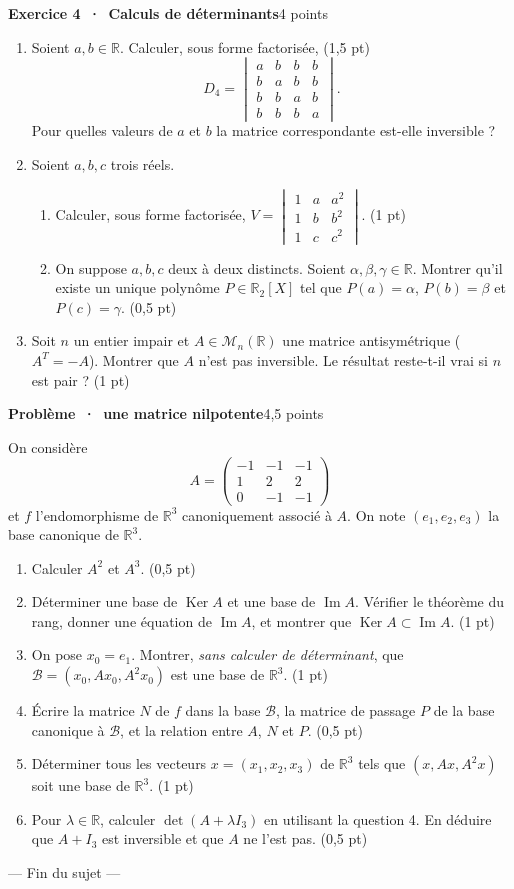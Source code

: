 \documentclass[a4paper,11pt]{article}
\numberwithin{equation}{section}
\numberwithin{figure}{section}
\numberwithin{table}{section}
\theoremstyle{enonce}
\theoremstyle{exemple}
\theoremstyle{remarque}
\newcommand{\R}{\mathbb{R}}
\providecommand{\Ker}{\operatorname{Ker}}\renewcommand{\Im}{\operatorname{Im}}
\newcommand{\pts}[1]{\hfill{\footnotesize\sffamily\color{Gris}(#1)}}
\newcommand{\Ex}[3]{\par\needspace{6\baselineskip}\vspace{1.3em}\noindent
  {\sffamily\bfseries\large\color{Bleu}Exercice #1 \,·\, #2}\hfill{\sffamily\small\color{Ocre}#3}\par
  \vspace{2pt}{\color{Filet}\rule{\linewidth}{0.4pt}}\par\smallskip}
\newcommand{\Pb}[2]{\par\needspace{6\baselineskip}\vspace{1.3em}\noindent
  {\sffamily\bfseries\large\color{Bleu}Problème \,·\, #1}\hfill{\sffamily\small\color{Ocre}#2}\par
  \vspace{2pt}{\color{Filet}\rule{\linewidth}{0.4pt}}\par\smallskip}
\begin{document}
\Ex{4}{Calculs de déterminants}{4 points}
\begin{enumerate}
\item Soient $a,b\in\R$. Calculer, sous forme factorisée, \pts{1,5 pt}
\[D_4=\begin{vmatrix}a&b&b&b\\b&a&b&b\\b&b&a&b\\b&b&b&a\end{vmatrix}.\]
Pour quelles valeurs de $a$ et $b$ la matrice correspondante est-elle inversible ?
\item Soient $a,b,c$ trois réels.
\begin{enumerate}
\item Calculer, sous forme factorisée, $V=\begin{vmatrix}1&a&a^2\\1&b&b^2\\1&c&c^2\end{vmatrix}$. \pts{1 pt}
\item On suppose $a,b,c$ deux à deux distincts. Soient $\alpha,\beta,\gamma\in\R$. Montrer qu'il existe un unique polynôme
$P\in\R_2[X]$ tel que $P(a)=\alpha$, $P(b)=\beta$ et $P(c)=\gamma$. \pts{0,5 pt}
\end{enumerate}
\item Soit $n$ un entier impair et $A\in\mathcal M_n(\R)$ une matrice antisymétrique ($A^T=-A$). Montrer que $A$ n'est pas
inversible. Le résultat reste-t-il vrai si $n$ est pair ? \pts{1 pt}
\end{enumerate}

\Pb{une matrice nilpotente}{4,5 points}
On considère
\[A=\begin{pmatrix}-1&-1&-1\\1&2&2\\0&-1&-1\end{pmatrix}\]
et $f$ l'endomorphisme de $\R^3$ canoniquement associé à $A$. On note $(e_1,e_2,e_3)$ la base canonique de $\R^3$.
\begin{enumerate}
\item Calculer $A^2$ et $A^3$. \pts{0,5 pt}
\item Déterminer une base de $\Ker A$ et une base de $\Im A$. Vérifier le théorème du rang, donner une équation de $\Im A$, et
montrer que $\Ker A\subset\Im A$. \pts{1 pt}
\item On pose $x_0=e_1$. Montrer, \emph{sans calculer de déterminant}, que $\mathcal B=(x_0,Ax_0,A^2x_0)$ est une base de
$\R^3$. \pts{1 pt}
\item Écrire la matrice $N$ de $f$ dans la base $\mathcal B$, la matrice de passage $P$ de la base canonique à $\mathcal B$, et
la relation entre $A$, $N$ et $P$. \pts{0,5 pt}
\item Déterminer tous les vecteurs $x=(x_1,x_2,x_3)$ de $\R^3$ tels que $(x,Ax,A^2x)$ soit une base de $\R^3$. \pts{1 pt}
\item Pour $\lambda\in\R$, calculer $\det(A+\lambda I_3)$ en utilisant la question 4. En déduire que $A+I_3$ est inversible et
que $A$ ne l'est pas. \pts{0,5 pt}
\end{enumerate}

\vfill
\begin{center}\sffamily\small\color{Gris}— Fin du sujet —\end{center}
\fi
\end{document}
